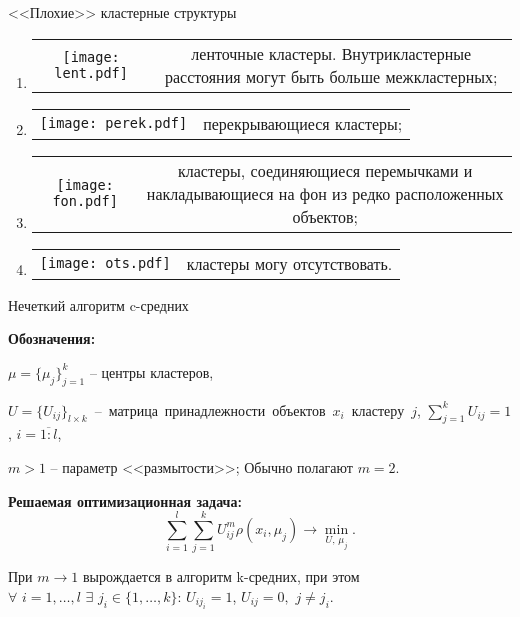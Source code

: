 \documentclass[unicode, notheorems, pdf]{beamer}
\begin{document}
\begin{frame}{<<Плохие>> кластерные структуры}
	\begin{enumerate}[]
		\item 
		\begin{tabular}{c c}
			\parbox{0.15\textwidth}{\texttt{[image: lent.pdf]}} & \parbox{0.7\textwidth}{ленточные кластеры. Внутрикластерные расстояния могут быть больше межкластерных;}
		\end{tabular}
		\vspace{0.5cm}
		\item 
		\begin{tabular}{c c}
			\parbox{0.15\textwidth}{\texttt{[image: perek.pdf]}} & \parbox{0.7\textwidth}{перекрывающиеся кластеры;}
		\end{tabular}
		\vspace{0.5cm}
		\item 
		\begin{tabular}{c c}
			\parbox{0.15\textwidth}{\texttt{[image: fon.pdf]}} & \parbox{0.7\textwidth}{кластеры, соединяющиеся перемычками и накладывающиеся на фон из редко расположенных объектов;}
		\end{tabular}
		\vspace{0.5cm}
		\item 
		\begin{tabular}{c c}
			\parbox{0.15\textwidth}{\texttt{[image: ots.pdf]}} & \parbox{0.7\textwidth}{кластеры могу отсутствовать.}
		\end{tabular}
	\end{enumerate}
\end{frame}

\begin{frame}{Нечеткий алгоритм c-средних}

	{\bf Обозначения:}

	$\mu=\{\mu_j\}_{j=1}^k$ -- центры кластеров, 

	\vspace{.25cm}
	\mbox{$U=\{U_{ij}\}_{l \times k}$ -- матрица принадлежности объектов $x_i$ кластеру $j$,} $\displaystyle\sum_{j=1}^k U_{ij}=1$, $i=\overline{1:l}$,

	$m > 1$ -- параметр <<размытости>>; Обычно полагают $m=2$.

	\pause
	\vspace{.5cm}
	{\bf Решаемая оптимизационная задача:}
	\[\sum_{i=1}^l \sum_{j=1}^k U_{ij}^m \rho(x_i,\mu_j) \to \min_{U,\,\mu_j}.\]

	\pause
	\vspace{.25cm}
	При $m \to 1$ вырождается в алгоритм k-средних, при этом\\
	\hspace{.5cm} $\forall$  $i=1,\dots,l$ $\exists$ $j_i\in\{1,\dots,k\}$: $U_{ij_i}=1$, $U_{ij}=0,$ $j\not=j_i$.
\end{frame}
\end{document}
